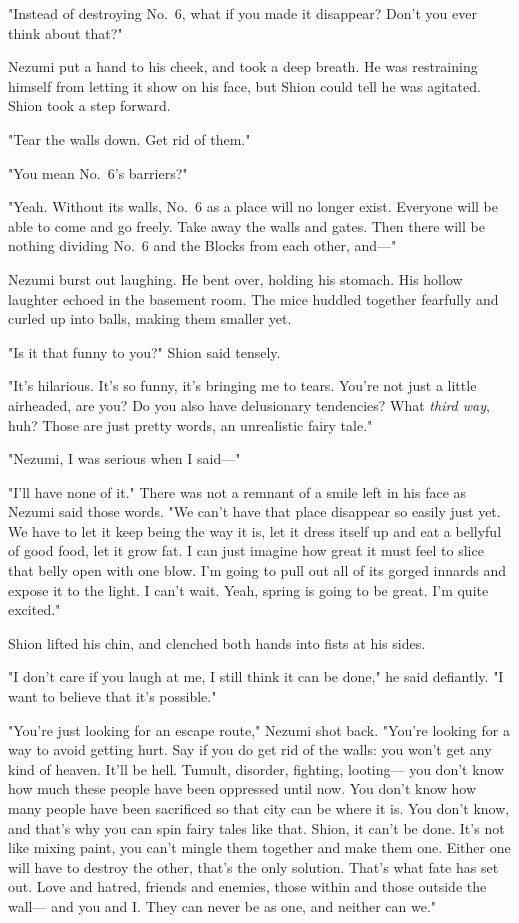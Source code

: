 "Instead of destroying No.~6, what if you made it disappear? Don't you
ever think about that?"

Nezumi put a hand to his cheek, and took a deep breath. He was
restraining himself from letting it show on his face, but Shion could
tell he was agitated. Shion took a step forward.

"Tear the walls down. Get rid of them."

"You mean No.~6's barriers?"

"Yeah. Without its walls, No.~6 as a place will no longer exist.
Everyone will be able to come and go freely. Take away the walls and
gates. Then there will be nothing dividing No.~6 and the Blocks from
each other, and---"

Nezumi burst out laughing. He bent over, holding his stomach. His hollow
laughter echoed in the basement room. The mice huddled together
fearfully and curled up into balls, making them smaller yet.

"Is it that funny to you?" Shion said tensely.

"It's hilarious. It's so funny, it's bringing me to tears. You're not
just a little airheaded, are you? Do you also have delusionary
tendencies? What \emph{third way}, huh? Those are just pretty words, an
unrealistic fairy tale."

"Nezumi, I was serious when I said---"

"I'll have none of it." There was not a remnant of a smile left in his
face as Nezumi said those words. "We can't have that place disappear so
easily just yet. We have to let it keep being the way it is, let it
dress itself up and eat a bellyful of good food, let it grow fat. I can
just imagine how great it must feel to slice that belly open with one
blow. I'm going to pull out all of its gorged innards and expose it to
the light. I can't wait. Yeah, spring is going to be great. I'm quite
excited."

Shion lifted his chin, and clenched both hands into fists at his sides.

"I don't care if you laugh at me, I still think it can be done," he said
defiantly. "I want to believe that it's possible."

"You're just looking for an escape route," Nezumi shot back. "You're
looking for a way to avoid getting hurt. Say if you do get rid of the
walls: you won't get any kind of heaven. It'll be hell. Tumult,
disorder, fighting, looting--- you don't know how much these people have
been oppressed until now. You don't know how many people have been
sacrificed so that city can be where it is. You don't know, and that's
why you can spin fairy tales like that. Shion, it can't be done. It's
not like mixing paint, you can't mingle them together and make them one.
Either one will have to destroy the other, that's the only solution.
That's what fate has set out. Love and hatred, friends and enemies,
those within and those outside the wall--- and you and I. They can never
be as one, and neither can we."


